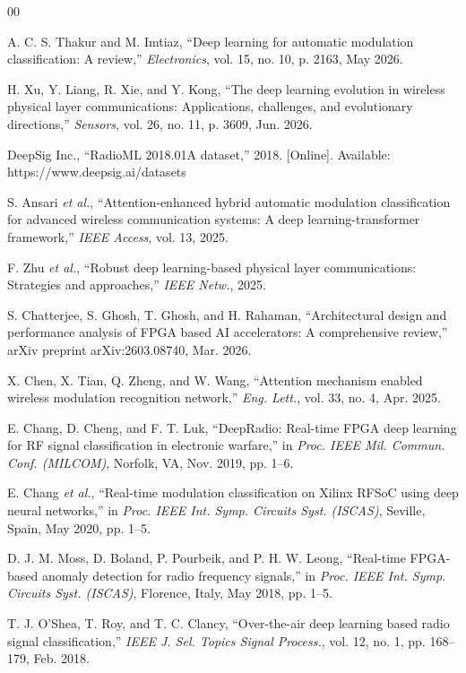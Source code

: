 \documentclass[conference]{IEEEtran}
\begin{document}
\begin{thebibliography}{00}

 A. C. S. Thakur and M. Imtiaz, ``Deep learning for automatic modulation classification: A review,'' \emph{Electronics}, vol. 15, no. 10, p. 2163, May 2026.

 H. Xu, Y. Liang, R. Xie, and Y. Kong, ``The deep learning evolution in wireless physical layer communications: Applications, challenges, and evolutionary directions,'' \emph{Sensors}, vol. 26, no. 11, p. 3609, Jun. 2026.

 DeepSig Inc., ``RadioML 2018.01A dataset,'' 2018. [Online]. Available: https://www.deepsig.ai/datasets

 S. Ansari \emph{et al.}, ``Attention-enhanced hybrid automatic modulation classification for advanced wireless communication systems: A deep learning-transformer framework,'' \emph{IEEE Access}, vol. 13, 2025.

 F. Zhu \emph{et al.}, ``Robust deep learning-based physical layer communications: Strategies and approaches,'' \emph{IEEE Netw.}, 2025.

 S. Chatterjee, S. Ghosh, T. Ghosh, and H. Rahaman, ``Architectural design and performance analysis of FPGA based AI accelerators: A comprehensive review,'' arXiv preprint arXiv:2603.08740, Mar. 2026.

 X. Chen, X. Tian, Q. Zheng, and W. Wang, ``Attention mechanism enabled wireless modulation recognition network,'' \emph{Eng. Lett.}, vol. 33, no. 4, Apr. 2025.

 E. Chang, D. Cheng, and F. T. Luk, ``DeepRadio: Real-time FPGA deep learning for RF signal classification in electronic warfare,'' in \emph{Proc. IEEE Mil. Commun. Conf. (MILCOM)}, Norfolk, VA, Nov. 2019, pp. 1--6.

 E. Chang \emph{et al.}, ``Real-time modulation classification on Xilinx RFSoC using deep neural networks,'' in \emph{Proc. IEEE Int. Symp. Circuits Syst. (ISCAS)}, Seville, Spain, May 2020, pp. 1--5.

 D. J. M. Moss, D. Boland, P. Pourbeik, and P. H. W. Leong, ``Real-time FPGA-based anomaly detection for radio frequency signals,'' in \emph{Proc. IEEE Int. Symp. Circuits Syst. (ISCAS)}, Florence, Italy, May 2018, pp. 1--5.

 T. J. O'Shea, T. Roy, and T. C. Clancy, ``Over-the-air deep learning based radio signal classification,'' \emph{IEEE J. Sel. Topics Signal Process.}, vol. 12, no. 1, pp. 168--179, Feb. 2018.


\end{thebibliography}
\end{document}

